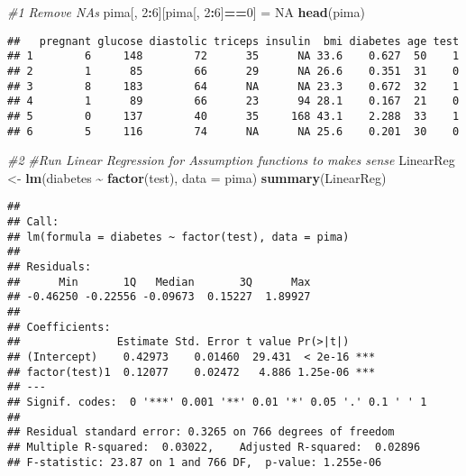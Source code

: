 \documentclass[
]{article}
\newenvironment{Shaded}{\begin{snugshade}}{\end{snugshade}}
\newcommand{\AttributeTok}[1]{\textcolor[rgb]{0.13,0.29,0.53}{#1}}
\newcommand{\CommentTok}[1]{\textcolor[rgb]{0.56,0.35,0.01}{\textit{#1}}}
\newcommand{\ConstantTok}[1]{\textcolor[rgb]{0.56,0.35,0.01}{#1}}
\newcommand{\DecValTok}[1]{\textcolor[rgb]{0.00,0.00,0.81}{#1}}
\newcommand{\FunctionTok}[1]{\textcolor[rgb]{0.13,0.29,0.53}{\textbf{#1}}}
\newcommand{\NormalTok}[1]{#1}
\newcommand{\OtherTok}[1]{\textcolor[rgb]{0.56,0.35,0.01}{#1}}
\newcommand{\SpecialCharTok}[1]{\textcolor[rgb]{0.81,0.36,0.00}{\textbf{#1}}}
\begin{document}
\begin{Shaded}
\begin{Highlighting}[]
\CommentTok{\#1 Remove NAs}
\NormalTok{pima[, }\DecValTok{2}\SpecialCharTok{:}\DecValTok{6}\NormalTok{][pima[, }\DecValTok{2}\SpecialCharTok{:}\DecValTok{6}\NormalTok{]}\SpecialCharTok{==}\DecValTok{0}\NormalTok{] }\OtherTok{=} \ConstantTok{NA}
\FunctionTok{head}\NormalTok{(pima)}
\end{Highlighting}
\end{Shaded}

\begin{verbatim}
##   pregnant glucose diastolic triceps insulin  bmi diabetes age test
## 1        6     148        72      35      NA 33.6    0.627  50    1
## 2        1      85        66      29      NA 26.6    0.351  31    0
## 3        8     183        64      NA      NA 23.3    0.672  32    1
## 4        1      89        66      23      94 28.1    0.167  21    0
## 5        0     137        40      35     168 43.1    2.288  33    1
## 6        5     116        74      NA      NA 25.6    0.201  30    0
\end{verbatim}

\begin{Shaded}
\begin{Highlighting}[]
\CommentTok{\#2}
\CommentTok{\#Run Linear Regression for Assumption functions to makes sense}
\NormalTok{LinearReg }\OtherTok{\textless{}{-}} \FunctionTok{lm}\NormalTok{(diabetes }\SpecialCharTok{\textasciitilde{}} \FunctionTok{factor}\NormalTok{(test), }\AttributeTok{data =}\NormalTok{ pima)}
\FunctionTok{summary}\NormalTok{(LinearReg)}
\end{Highlighting}
\end{Shaded}

\begin{verbatim}
## 
## Call:
## lm(formula = diabetes ~ factor(test), data = pima)
## 
## Residuals:
##      Min       1Q   Median       3Q      Max 
## -0.46250 -0.22556 -0.09673  0.15227  1.89927 
## 
## Coefficients:
##               Estimate Std. Error t value Pr(>|t|)    
## (Intercept)    0.42973    0.01460  29.431  < 2e-16 ***
## factor(test)1  0.12077    0.02472   4.886 1.25e-06 ***
## ---
## Signif. codes:  0 '***' 0.001 '**' 0.01 '*' 0.05 '.' 0.1 ' ' 1
## 
## Residual standard error: 0.3265 on 766 degrees of freedom
## Multiple R-squared:  0.03022,    Adjusted R-squared:  0.02896 
## F-statistic: 23.87 on 1 and 766 DF,  p-value: 1.255e-06
\end{verbatim}
\end{document}
